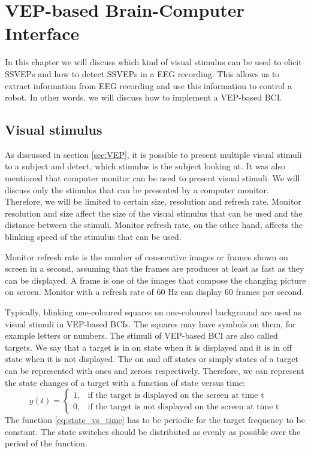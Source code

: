 
\chapter{VEP-based Brain-Computer Interface}

In this chapter we will discuss which kind of visual stimulus can be used to elicit \glspl{SSVEP} and how to detect \glspl{SSVEP} in a \gls{EEG} recording. This allows us to extract information from EEG recording and use this information to control a robot. In other words, we will discuss how to implement a \gls{VEP}-based \gls{BCI}.

\section{Visual stimulus}

As discussed in section \ref{sec:VEP}, it is possible to present multiple visual stimuli to a subject and detect, which stimulus is the subject looking at. It was also mentioned that computer monitor can be used to present visual stimuli. We will discuss only the stimulus that can be presented by a computer monitor. Therefore, we will be limited to certain size, resolution and refresh rate. Monitor resolution and size affect the size of the visual stimulus that can be used and the distance between the stimuli. Monitor refresh rate, on the other hand, affects the blinking speed of the stimulus that can be used.

Monitor refresh rate is the number of consecutive images or frames shown on screen in a second, assuming that the frames are produces at least as fast as they can be displayed. A frame is one of the images that compose the changing picture on screen. Monitor with a refresh rate of 60 Hz can display 60 frames per second. 

Typically, blinking one-coloured squares on one-coloured background are used as visual stimuli in \gls{VEP}-based \glspl{BCI}. The squares may have symbols on them, for example letters or numbers. The stimuli of \gls{VEP}-based \gls{BCI} are also called targets. We say that a target is in on state when it is displayed and it is in off state when it is not displayed. The on and off states or simply states of a target can be represented with ones and zeroes respectively. Therefore, we can represent the state changes of a target with a function of state versus time:
\begin{equation}
	\label{eq:state_vs_time}
	y(t)=
	\begin{cases}
		1,	&\mbox{if the target is displayed on the screen at time t}\\
		0,	&\mbox{if the target is not displayed on the screen at time t}
	\end{cases}
\end{equation}
The function \ref{eq:state_vs_time} has to be periodic for the target frequency to be constant. The state switches should be distributed as evenly as possible over the period of the function.


